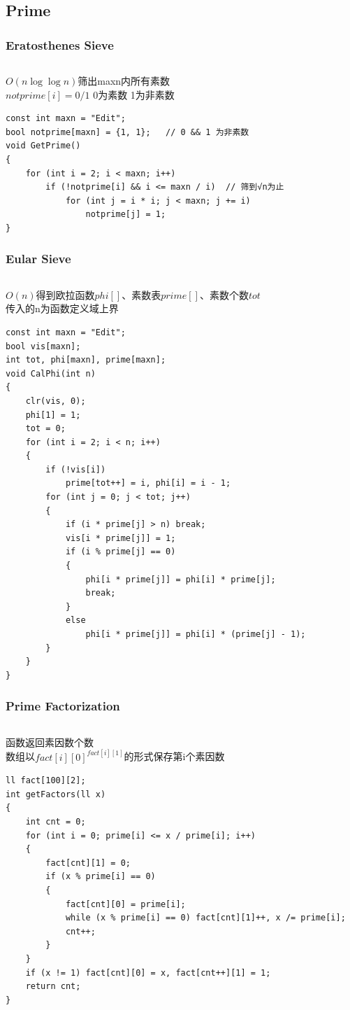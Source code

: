 \documentclass[twoside]{article}
\begin{document}
\subsection{Prime}
\subsubsection{Eratosthenes Sieve}
\begin{lstlisting}
\end{lstlisting}
$O(n\log\log n)$筛出maxn内所有素数\\
$notprime[i] = 0/1$ 0为素数 1为非素数\\
\begin{lstlisting}
const int maxn = "Edit";
bool notprime[maxn] = {1, 1};   // 0 && 1 为非素数
void GetPrime()
{
    for (int i = 2; i < maxn; i++)
        if (!notprime[i] && i <= maxn / i)  // 筛到√n为止
            for (int j = i * i; j < maxn; j += i)
                notprime[j] = 1;
}
\end{lstlisting}
\subsubsection{Eular Sieve}
\begin{lstlisting}
\end{lstlisting}
$O(n)$得到欧拉函数$phi[]$、素数表$prime[]$、素数个数$tot$\\
传入的n为函数定义域上界
\begin{lstlisting}
const int maxn = "Edit";
bool vis[maxn];
int tot, phi[maxn], prime[maxn];
void CalPhi(int n)
{
    clr(vis, 0);
    phi[1] = 1;
    tot = 0;
    for (int i = 2; i < n; i++)
    {
        if (!vis[i])
            prime[tot++] = i, phi[i] = i - 1;
        for (int j = 0; j < tot; j++)
        {
            if (i * prime[j] > n) break;
            vis[i * prime[j]] = 1;
            if (i % prime[j] == 0)
            {
                phi[i * prime[j]] = phi[i] * prime[j];
                break;
            }
            else
                phi[i * prime[j]] = phi[i] * (prime[j] - 1);
        }
    }
}
\end{lstlisting}
\subsubsection{Prime Factorization}
\begin{lstlisting}
\end{lstlisting}
函数返回素因数个数\\
数组以$fact[i][0]^{fact[i][1]}$的形式保存第i个素因数
\begin{lstlisting}
ll fact[100][2];
int getFactors(ll x)
{
    int cnt = 0;
    for (int i = 0; prime[i] <= x / prime[i]; i++)
    {
        fact[cnt][1] = 0;
        if (x % prime[i] == 0)
        {
            fact[cnt][0] = prime[i];
            while (x % prime[i] == 0) fact[cnt][1]++, x /= prime[i];
            cnt++;
        }
    }
    if (x != 1) fact[cnt][0] = x, fact[cnt++][1] = 1;
    return cnt;
}
\end{lstlisting}
\end{document}
